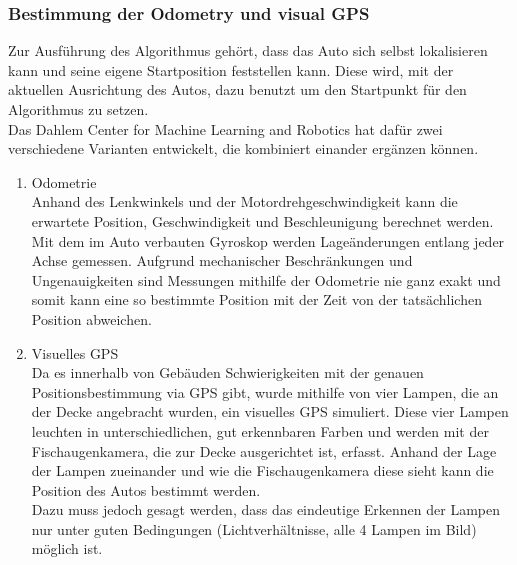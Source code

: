 \subsubsection{Bestimmung der Odometry und visual GPS}
Zur Ausführung des Algorithmus gehört, dass das Auto sich selbst lokalisieren kann und seine eigene Startposition feststellen kann. Diese wird, mit der aktuellen Ausrichtung des Autos, dazu benutzt um den Startpunkt für den Algorithmus zu setzen. \\
Das Dahlem Center for Machine Learning and Robotics hat dafür zwei verschiedene Varianten entwickelt, die kombiniert einander ergänzen können. \\
\begin{enumerate}
\item Odometrie \\
Anhand des Lenkwinkels und der Motordrehgeschwindigkeit kann die erwartete Position, Geschwindigkeit und Beschleunigung berechnet werden. Mit dem im Auto verbauten Gyroskop werden Lageänderungen entlang jeder Achse gemessen. Aufgrund mechanischer Beschränkungen und Ungenauigkeiten sind Messungen mithilfe der Odometrie nie ganz exakt und somit kann eine so bestimmte Position mit der Zeit von der tatsächlichen Position abweichen.
\item Visuelles GPS\\
Da es innerhalb von Gebäuden Schwierigkeiten mit der genauen Positionsbestimmung via GPS gibt, wurde mithilfe von vier Lampen, die an der Decke angebracht wurden, ein visuelles GPS simuliert. Diese vier Lampen leuchten in unterschiedlichen, gut erkennbaren Farben und werden mit der Fischaugenkamera, die zur Decke ausgerichtet ist, erfasst. Anhand der Lage der Lampen zueinander und wie die Fischaugenkamera diese sieht kann die Position des Autos bestimmt werden.\\
Dazu muss jedoch gesagt werden, dass das eindeutige Erkennen der Lampen nur unter guten Bedingungen (Lichtverhältnisse, alle 4 Lampen im Bild) möglich ist. 
\end{enumerate}

